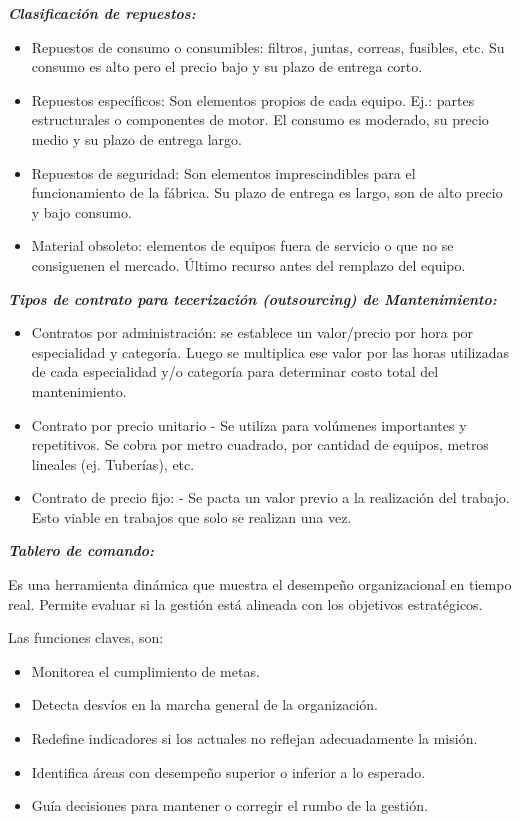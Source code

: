 \documentclass[a4paper,oneside,11pt]{article}
\begin{document}
\textbf{\textit{Clasificación de repuestos:}}

\begin{itemize}
    \item Repuestos de consumo o consumibles: filtros, juntas, correas, fusibles, etc. Su consumo es alto pero el precio bajo y su plazo de entrega corto.
    \item Repuestos específicos: Son elementos propios de cada equipo. Ej.: partes
    estructurales o componentes de motor. El consumo es moderado, su precio medio y su plazo de entrega largo.
    \item Repuestos de seguridad: Son elementos imprescindibles para el funcionamiento de la fábrica. Su plazo de entrega es largo, son de alto precio y bajo consumo.
    \item Material obsoleto: elementos de equipos fuera de servicio o que no se consiguenen el mercado. Último recurso antes del remplazo del equipo.
\end{itemize}

\textbf{\textit{Tipos de contrato para tecerización (outsourcing) de Mantenimiento:}}

\begin{itemize}
    \item Contratos por administración: se establece un valor/precio por hora por especialidad y categoría. Luego se multiplica ese valor por las horas utilizadas de cada especialidad y/o categoría para determinar costo total del mantenimiento.
    \item Contrato por precio unitario - Se utiliza para volúmenes importantes y repetitivos. Se cobra por metro cuadrado, por cantidad de equipos, metros lineales (ej. Tuberías), etc. 
    \item Contrato de precio fijo: - Se pacta un valor previo a la realización del trabajo. Esto viable en trabajos que solo se realizan una vez.
\end{itemize}

\textbf{\textit{Tablero de comando:}}

Es una herramienta dinámica que muestra el desempeño organizacional en tiempo real. Permite evaluar si la gestión está alineada con los objetivos estratégicos.

Las funciones claves, son: 
\begin{itemize}
    \item Monitorea el cumplimiento de metas.
    \item Detecta desvíos en la marcha general de la organización.
    \item Redefine indicadores si los actuales no reflejan adecuadamente la misión.
    \item Identifica áreas con desempeño superior o inferior a lo esperado.
    \item Guía decisiones para mantener o corregir el rumbo de la gestión.
\end{itemize}
\end{document}
